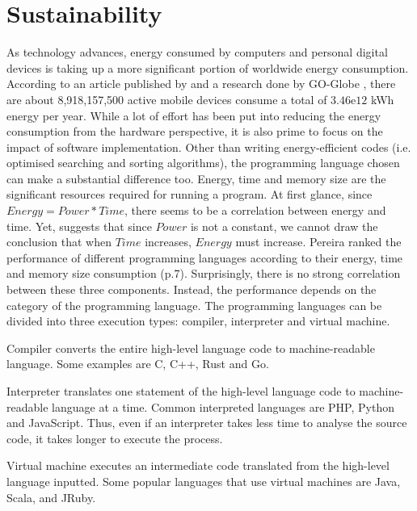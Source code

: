 \section{Sustainability}
\label{Sustainability}
As technology advances, energy consumed by computers and personal digital devices is taking up a more significant portion of worldwide energy consumption. 
According to an article published by \cite{energypy} and a research done by GO-Globe , there are about 8,918,157,500 active
mobile devices consume a total of $3.46\mathrm{e}{12}$ kWh energy per year.
While a lot of effort has been put into reducing the energy consumption from the hardware perspective,
it is also prime to focus on the impact of software implementation.
Other than writing energy-efficient codes (i.e. optimised searching and sorting algorithms), the programming language 
chosen can make a substantial difference too. Energy, time and memory size are the significant resources required for running a program.
At first glance, since \(Energy = Power * Time\), there seems to be a correlation between energy and time. Yet,
\cite{energyplanguage} suggests that since \(Power\) is not a constant, we cannot draw the conclusion that
when \(Time\) increases, \(Energy\) must increase. 
Pereira ranked the performance of different programming languages according to their energy, time and memory size consumption (p.7). 
Surprisingly, there is no strong correlation between these three components. 
Instead, the performance depends on the category of the programming language.
The programming languages can be divided into three execution types: compiler, interpreter and virtual machine.

\begin{description}
    \item Compiler converts the entire high-level language code to machine-readable language. Some examples are C, C++, Rust and Go. 
    \item Interpreter translates one statement of the high-level language code to machine-readable language at a time. Common interpreted languages are PHP, Python and JavaScript.
    Thus, even if an interpreter takes less time to analyse the source code, it takes longer to execute the process.
    \item Virtual machine executes an intermediate code translated from the high-level language inputted. Some popular languages that use virtual machines are Java, Scala, and JRuby.
\end{description}

